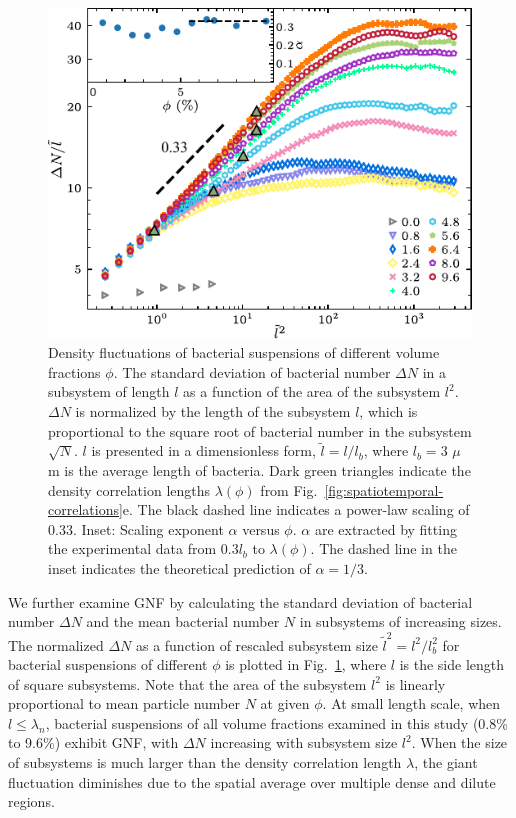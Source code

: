 \begin{figure}[!ht]
\begin{center}
\includegraphics[width=4.5in]{figs/5-GNF/4.pdf}
\caption[Giant Number Fluctuations in Active Turbulence]
{
Density fluctuations of bacterial suspensions of different volume fractions $\phi$. The standard deviation of bacterial number $\Delta N$ in a subsystem of length $l$ as a function of the area of the subsystem $l^2$. $\Delta N$ is normalized by the length of the subsystem $l$, which is proportional to the square root of bacterial number in the subsystem $\sqrt N$. $l$ is presented in a dimensionless form, $\tilde{l} = l/l_b$, where $l_b = 3$ $\mu$m is the average length of bacteria. Dark green triangles indicate the density correlation lengths $\lambda(\phi)$ from Fig.~\ref{fig:spatiotemporal-correlations}e. The black dashed line indicates a power-law scaling of 0.33.
Inset: Scaling exponent $\alpha$ versus $\phi$. $\alpha$ are extracted by fitting the experimental data from 0.3$l_b$ to $\lambda(\phi)$. The dashed line in the inset indicates the theoretical prediction of $\alpha=1/3$.
}
\label{fig:GNF}
\end{center}
\end{figure}

We further examine GNF by calculating the standard deviation of bacterial number $\Delta N$ and the mean bacterial number $N$ in subsystems of increasing sizes. The normalized $\Delta N$ as a function of rescaled subsystem size $\tilde{l}^2=l^2/l_b^2$ for bacterial suspensions of different $\phi$ is plotted in Fig.~\ref{fig:GNF}, where $l$ is the side length of square subsystems.
Note that the area of the subsystem $l^2$ is linearly proportional to mean particle number $N$ at given $\phi$. At small length scale, when $l\le\lambda_n$, bacterial suspensions of all volume fractions examined in this study (0.8\% to 9.6\%) exhibit GNF, with $\Delta N$ increasing with subsystem size $l^2$. When the size of subsystems is much larger than the density correlation length $\lambda$, the giant fluctuation diminishes due to the spatial average over multiple dense and dilute regions.

